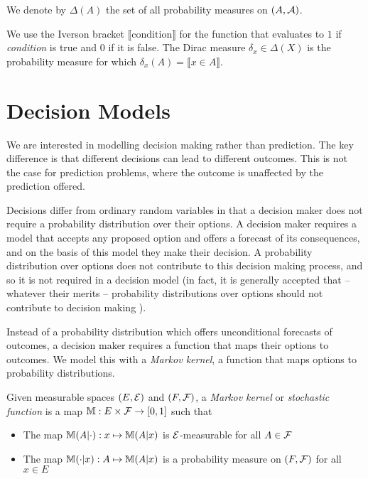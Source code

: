 We denote by $\Delta(A)$ the set of all probability measures on $(A,\mathcal{A})$.

We use the Iverson bracket $\llbracket \mathrm{condition} \rrbracket$ for the function that evaluates to $1$ if \emph{condition} is true and $0$ if it is false. The Dirac measure $\delta_x \in \Delta(X)$ is the probability measure for which $\delta_x(A) = \llbracket x\in A \rrbracket$.

\section{Decision Models}

We are interested in modelling decision making rather than prediction. The key difference is that different decisions can lead to different outcomes. This is not the case for prediction problems, where the outcome is unaffected by the prediction offered.

Decisions differ from ordinary random variables in that a decision maker does not require a probability distribution over their options. A decision maker requires a model that accepts any proposed option and offers a forecast of its consequences, and on the basis of this model they make their decision. A probability distribution over options does not contribute to this decision making process, and so it is not required in a decision model (in fact, it is generally accepted that -- whatever their merits -- probability distributions over options should not contribute to decision making \citet{liu_ramsey_2020}).

Instead of a probability distribution which offers unconditional forecasts of outcomes, a decision maker requires a function that maps their options to outcomes. We model this with a \emph{Markov kernel}, a function that maps options to probability distributions.

\begin{definition}\label{def:markov_kern}
Given measurable spaces $(E,\mathcal{E})$ and $(F,\mathcal{F})$, a \emph{Markov kernel} or \emph{stochastic function} is a map $\mathbb{M}:E\times\mathcal{F}\to [0,1]$ such that
\begin{itemize}
	\item The map $\mathbb{M}(A|\cdot):x\mapsto \mathbb{M}(A|x)$ is $\mathcal{E}$-measurable for all $A\in \mathcal{F}$
	\item The map $\mathbb{M}(\cdot|x):A\mapsto \mathbb{M}(A|x)$ is a probability measure on $(F,\mathcal{F})$ for all $x\in E$
\end{itemize}
\end{definition}

